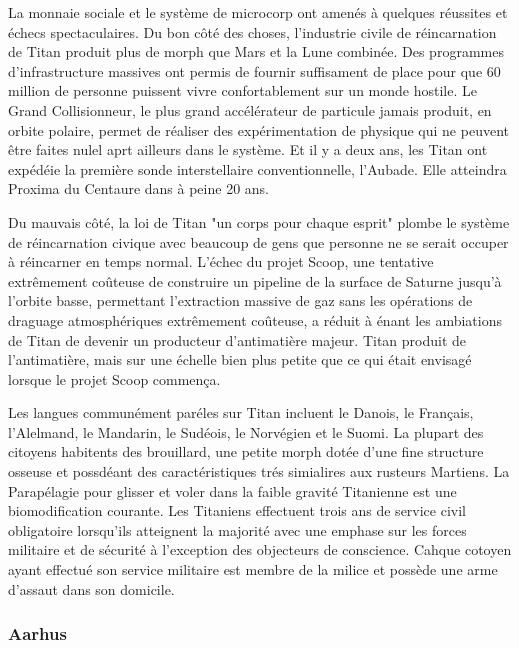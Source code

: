                                                                      La monnaie sociale et le système de microcorp ont amenés à quelques réussites et échecs spectaculaires. Du bon côté des choses, l'industrie civile de réincarnation de Titan produit plus de morph que Mars et la Lune combinée. Des programmes d'infrastructure massives ont permis de fournir suffisament de place pour que 60 million de personne puissent vivre confortablement sur un monde hostile. Le Grand Collisionneur, le plus grand accélérateur de particule jamais produit, en orbite polaire, permet de réaliser des expérimentation de physique qui ne peuvent être faites nulel aprt ailleurs dans le système. Et il y a deux ans, les Titan ont expédéie la première sonde interstellaire conventionnelle, l'Aubade. Elle atteindra Proxima du Centaure dans à peine 20 ans. 

                                                                     Du mauvais côté, la loi de Titan "un corps pour chaque esprit" plombe le système de réincarnation civique avec beaucoup de gens que personne ne se serait occuper à réincarner en temps normal. L'échec du projet Scoop, une tentative extrêmement coûteuse de construire un pipeline de la surface de Saturne jusqu'à l'orbite basse, permettant l'extraction massive de gaz sans les opérations de draguage atmosphériques extrêmement coûteuse, a réduit à énant les ambiations de Titan de devenir un producteur d'antimatière majeur. Titan produit de l'antimatière, mais sur une échelle bien plus petite que ce qui était envisagé lorsque le projet Scoop commença. 

                                                                     Les langues communément paréles sur Titan incluent le Danois, le Français, l'Alelmand, le Mandarin, le Sudéois, le Norvégien et le Suomi. La plupart des citoyens habitents des brouillard, une petite morph dotée d'une fine structure osseuse et possdéant des caractéristiques trés simialires aux rusteurs Martiens. La Parapélagie pour glisser et voler dans la faible gravité Titanienne est une biomodification courante. Les Titaniens effectuent trois ans de service civil obligatoire lorsqu'ils atteignent la majorité avec une emphase sur les forces militaire et de sécurité à l'exception des objecteurs de conscience. Cahque cotoyen ayant effectué son service militaire est membre de la milice et possède une arme d'assaut dans son domicile. 

                                                                     \subsubsection{Aarhus} \label{sec:aarhus} 

